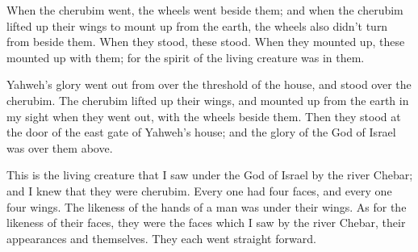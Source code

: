 {When the cherubim went, the wheels went beside them; and when the cherubim lifted up their wings to mount up from the earth, the wheels also didn’t turn from beside them.
When they stood, these stood. When they mounted up, these mounted up with them; for the spirit of the living creature was in them.
\par }{\PP {}Yahweh’s glory went out from over the threshold of the house, and stood over the cherubim.
The cherubim lifted up their wings, and mounted up from the earth in my sight when they went out, with the wheels beside them. Then they stood at the door of the east gate of Yahweh’s house; and the glory of the God of Israel was over them above.
\par }{\PP {}This is the living creature that I saw under the God of Israel by the river Chebar; and I knew that they were cherubim.
Every one had four faces, and every one four wings. The likeness of the hands of a man was under their wings.
As for the likeness of their faces, they were the faces which I saw by the river Chebar, their appearances and themselves. They each went straight forward.

}
